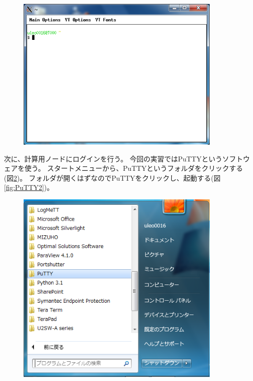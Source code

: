 \documentclass[12pt,a4paper,dvipdfmx]{jarticle}
\begin{document}
\begin{figure}
  \begin{center}
    \includegraphics[clip, width=10.0cm]{fig/xboot_.png}
  \end{center}
  \caption{}
  \label{fig:xboot}
\end{figure}

次に、計算用ノードにログインを行う。
今回の実習ではPuTTYというソフトウェアを使う。
スタートメニューから、PuTTYというフォルダをクリックする(図\ref{fig:PuTTY})。
フォルダが開くはずなのでPuTTYをクリックし、起動する(図\ref{fig:PuTTY2})。
\begin{figure}
  \begin{center}
    \includegraphics[clip, width=10.0cm]{fig/PuTTY_.png}
  \end{center}
  \caption{}
  \label{fig:PuTTY}
\end{figure}
\end{document}
